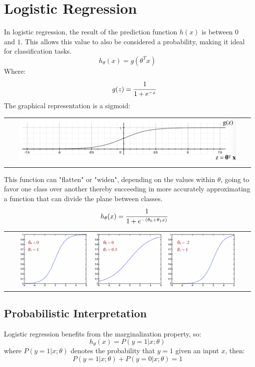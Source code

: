 \section{Logistic Regression}

In logistic regression, the result of the prediction function $h(x)$ is between $0$ and $1$. This allows this value to also be considered a probability, making it ideal for classification tasks.
\begin{equation} \tag{Prediction Function}
    h_\theta(x) = g(\theta^Tx)
\end{equation}
Where:
\begin{equation} \tag*{}
    g(z) = \cfrac{1}{1+e^{-z}}
\end{equation}
The graphical representation is a sigmoid:
\begin{center}
    \begin{tabular}{c}
        \\ \includegraphics[width=0.9\textwidth]{images/LogisticRegression1.png} \\ \\
    \end{tabular}
\end{center}
This function can "flatten" or "widen", depending on the values within $\theta$, going to favor one class over another thereby succeeding in more accurately approximating a function that can divide the plane between classes.
\begin{equation} \tag*{}
    h_\theta(x) = \cfrac{1}{1+e^{-(\theta_0+\theta_1x)}}
\end{equation}
\begin{center}
    \begin{tabular}{c}
        \\ \includegraphics[width=0.9\textwidth]{images/LogisticRegression2.png}
    \end{tabular}
\end{center}

\subsection{Probabilistic Interpretation}
Logistic regression benefits from the marginalization property, so:
\begin{equation} \tag*{}
    h_\theta(x) = P(y=1|x;\theta)
\end{equation}
where $P(y=1|x;\theta)$ denotes the probability that $y=1$ given an input $x$, then:
\begin{equation} \tag*{}
    P(y=1|x;\theta) + P(y=0|x;\theta) = 1
\end{equation}

\newpage